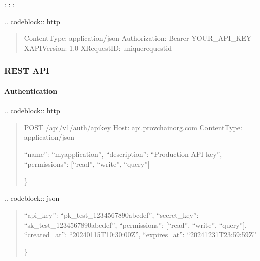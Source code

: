 \documentclass[letterpaper,10pt,english]{sphinxmanual}
\begin{document}
\sphinxAtStartPar
{}
\sphinxhyphen{} : 
\sphinxhyphen{} : 
\sphinxhyphen{} : 

\sphinxAtStartPar
{}
.. code\sphinxhyphen{}block:: http
\begin{quote}

\sphinxAtStartPar
Content\sphinxhyphen{}Type: application/json
Authorization: Bearer YOUR\_API\_KEY
X\sphinxhyphen{}API\sphinxhyphen{}Version: 1.0
X\sphinxhyphen{}Request\sphinxhyphen{}ID: unique\sphinxhyphen{}request\sphinxhyphen{}id
\end{quote}


\subsubsection{REST API}
\label{\detokenize{api/index:rest-api}}

\paragraph{Authentication}
\label{\detokenize{api/index:authentication}}
\sphinxAtStartPar
{}
.. code\sphinxhyphen{}block:: http
\begin{quote}

\sphinxAtStartPar
POST /api/v1/auth/api\sphinxhyphen{}key
Host: api.provchain\sphinxhyphen{}org.com
Content\sphinxhyphen{}Type: application/json
\begin{description}
\sphinxlineitem{\{}
\sphinxAtStartPar
“name”: “my\sphinxhyphen{}application”,
“description”: “Production API key”,
“permissions”: {[}“read”, “write”, “query”{]}

\end{description}

\sphinxAtStartPar
\}
\end{quote}

\sphinxAtStartPar
{}
.. code\sphinxhyphen{}block:: json
\begin{quote}
\begin{description}
\sphinxlineitem{\{}
\sphinxAtStartPar
“api\_key”: “pk\_test\_1234567890abcdef”,
“secret\_key”: “sk\_test\_1234567890abcdef”,
“permissions”: {[}“read”, “write”, “query”{]},
“created\_at”: “2024\sphinxhyphen{}01\sphinxhyphen{}15T10:30:00Z”,
“expires\_at”: “2024\sphinxhyphen{}12\sphinxhyphen{}31T23:59:59Z”

\end{description}

\sphinxAtStartPar
\}
\end{quote}
\end{document}
